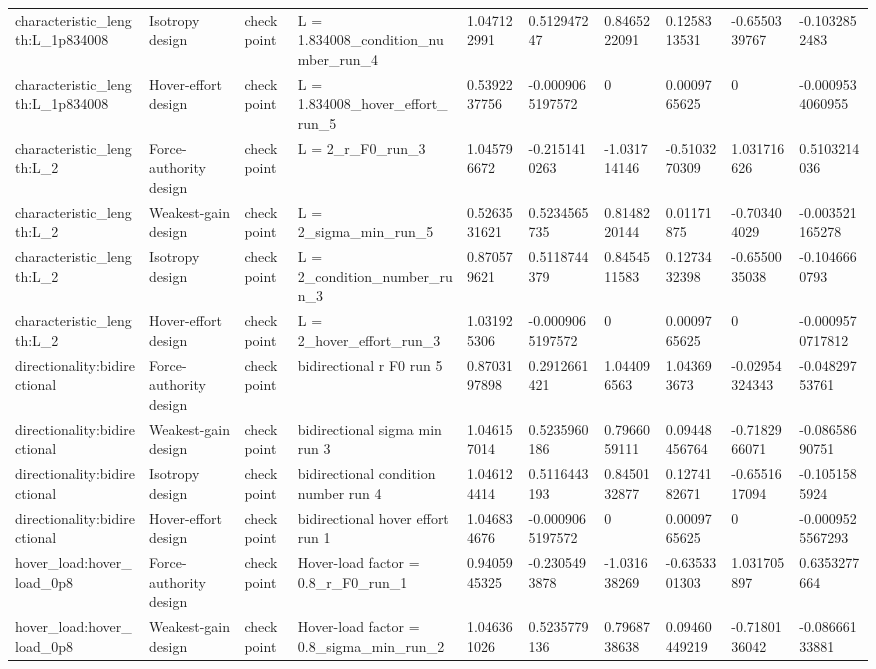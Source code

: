 \begin{tabular}{@{}llllllllll@{}}
characteristic\_length:L\_1p834008 & Isotropy design & checkpoint & L = 1.834008\_condition\_number\_run\_4 & 1.047122991 & 0.512947247 & 0.8465222091 & 0.1258313531 & -0.6550339767 & -0.1032852483 \\
characteristic\_length:L\_1p834008 & Hover-effort design & checkpoint & L = 1.834008\_hover\_effort\_run\_5 & 0.5392237756 & -0.0009065197572 & 0 & 0.0009765625 & 0 & -0.0009534060955 \\
characteristic\_length:L\_2 & Force-authority design & checkpoint & L = 2\_r\_F0\_run\_3 & 1.045796672 & -0.2151410263 & -1.031714146 & -0.5103270309 & 1.031716626 & 0.5103214036 \\
characteristic\_length:L\_2 & Weakest-gain design & checkpoint & L = 2\_sigma\_min\_run\_5 & 0.5263531621 & 0.5234565735 & 0.8148220144 & 0.01171875 & -0.703404029 & -0.003521165278 \\
characteristic\_length:L\_2 & Isotropy design & checkpoint & L = 2\_condition\_number\_run\_3 & 0.870579621 & 0.5118744379 & 0.8454511583 & 0.1273432398 & -0.6550035038 & -0.1046660793 \\
characteristic\_length:L\_2 & Hover-effort design & checkpoint & L = 2\_hover\_effort\_run\_3 & 1.031925306 & -0.0009065197572 & 0 & 0.0009765625 & 0 & -0.0009570717812 \\
directionality:bidirectional & Force-authority design & checkpoint & bidirectional r F0 run 5 & 0.8703197898 & 0.2912661421 & 1.044096563 & 1.043693673 & -0.02954324343 & -0.04829753761 \\
directionality:bidirectional & Weakest-gain design & checkpoint & bidirectional sigma min run 3 & 1.046157014 & 0.5235960186 & 0.7966059111 & 0.09448456764 & -0.7182966071 & -0.08658690751 \\
directionality:bidirectional & Isotropy design & checkpoint & bidirectional condition number run 4 & 1.046124414 & 0.5116443193 & 0.8450132877 & 0.1274182671 & -0.6551617094 & -0.1051585924 \\
directionality:bidirectional & Hover-effort design & checkpoint & bidirectional hover effort run 1 & 1.046834676 & -0.0009065197572 & 0 & 0.0009765625 & 0 & -0.0009525567293 \\
hover\_load:hover\_load\_0p8 & Force-authority design & checkpoint & Hover-load factor = 0.8\_r\_F0\_run\_1 & 0.9405945325 & -0.2305493878 & -1.031638269 & -0.6353301303 & 1.031705897 & 0.6353277664 \\
hover\_load:hover\_load\_0p8 & Weakest-gain design & checkpoint & Hover-load factor = 0.8\_sigma\_min\_run\_2 & 1.046361026 & 0.5235779136 & 0.7968738638 & 0.09460449219 & -0.7180136042 & -0.08666133881 \\

\end{tabular}
